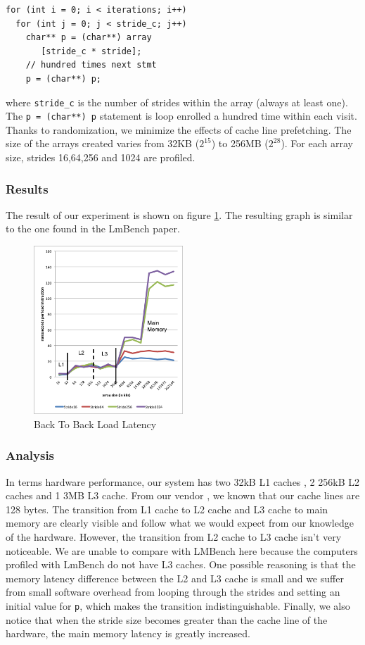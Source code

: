 \begin{lstlisting}
for (int i = 0; i < iterations; i++)
  for (int j = 0; j < stride_c; j++)
    char** p = (char**) array
       [stride_c * stride];
    // hundred times next stmt
    p = (char**) p;
\end{lstlisting}

where \texttt{stride\_c} is the number of strides within the array (always at least one). The \texttt{p = (char**) p} statement is loop enrolled a hundred time within each visit. Thanks to randomization, we minimize the effects of cache line prefetching. The size of the arrays created varies from 32KB ($2^{15}$) to 256MB ($2^{28}$). For each array size, strides 16,64,256 and 1024 are profiled. 

\subsubsection{Results}

The result of our experiment is shown on figure \ref{fig:b2blatency}. The resulting graph is similar to the one found in the LmBench paper. 

\begin{figure}
 \centering
  \includegraphics[width=0.5\textwidth]{image/backtobackload2.png}
  \caption{Back To Back Load Latency}
 \label{fig:b2blatency}
\end{figure}

\subsubsection{Analysis}

In terms hardware performance, our system has two 32kB L1 caches , 2 256kB L2 caches and 1 3MB L3 cache. From our vendor \cite{vendor}, we known that our cache lines are 128 bytes. The transition from L1 cache to L2 cache and L3 cache to main memory are clearly visible and follow what we would expect from our knowledge of the hardware. However, the transition from L2 cache to L3 cache isn't very noticeable. We are unable to compare with LMBench here because the computers profiled with LmBench do not have L3 caches. One possible reasoning is that the memory latency difference between the L2 and L3 cache is small and we suffer from small software overhead from looping through the strides and setting an initial value for \texttt{p}, which makes the transition indistinguishable. Finally, we also notice that when the stride size becomes greater than the cache line of the hardware, the main memory latency is greatly increased.

